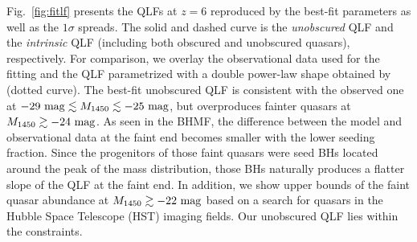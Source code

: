 \documentclass[twocolumn, twocolappendix]{aastex63}
\newcommand{\Muv}{M_{1450}}
\begin{document}
\begin{CJK*}{UTF8}{gbsn}
Fig.~\ref{fig:fitlf} presents the QLFs at $z=6$ reproduced by the best-fit parameters as well as the $1\sigma$ spreads.
The solid and dashed curve is the {\it unobscured} QLF %
and the {\it intrinsic} QLF (including both obscured and unobscured quasars), respectively.
For comparison, we overlay the observational data used for the fitting and the QLF parametrized with 
a double power-law shape obtained by  (dotted curve).
The best-fit unobscured QLF is consistent with the observed one at $-29~{\rm mag} \lesssim \Muv \lesssim -25~{\rm mag}$,
but overproduces fainter quasars at $\Muv\gtrsim -24~{\rm mag}$.
As seen in the BHMF, the difference between the model and observational data at the faint end becomes smaller with
the lower seeding fraction.
Since the progenitors of those faint quasars were seed BHs located around the peak of the mass distribution,
those BHs naturally produces a flatter slope of the QLF at the faint end.
In addition, we show upper bounds of the faint quasar abundance at $\Muv\gtrsim -22~{\rm mag}$ \citep[green symbols;][]{2022NatAs...6..850J}
based on a search for quasars in the Hubble Space Telescope (HST) imaging fields.
Our unobscured QLF lies within the constraints.



\end{CJK*}
\end{document}
